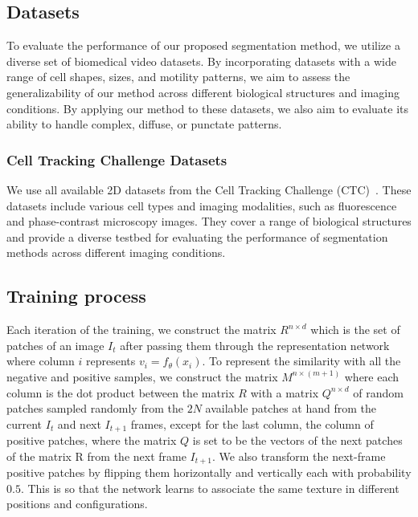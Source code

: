 \documentclass[./dissertation.tex]{subfiles}
\begin{document}
\subsection{Datasets}


To evaluate the performance of our proposed segmentation method, we utilize a diverse set of biomedical video datasets. By incorporating datasets with a wide range of cell shapes, sizes, and motility patterns, we aim to assess the generalizability of our method across different biological structures and imaging conditions. By applying our method to these datasets, we also aim to evaluate its ability to handle complex, diffuse, or punctate patterns.

\subsubsection{Cell Tracking Challenge Datasets}
We use all available 2D datasets from the Cell Tracking Challenge (CTC)~\cite{mavska2023cell}. These datasets include various cell types and imaging modalities, such as fluorescence and phase-contrast microscopy images. They cover a range of biological structures and provide a diverse testbed for evaluating the performance of segmentation methods across different imaging conditions.



\subsection{Training process}

Each iteration of the training, we construct the matrix \(R^{n \times d}\) which is the set of patches of an image \(I_t\) after passing them through the representation network where column \(i\) represents \(v_i = f_\theta(x_i)\). To represent the similarity with all the negative and positive samples, we construct the matrix \(M ^{n \times (m+1)}\) where each column is the dot product between the matrix \(R\) with a matrix \(Q^{n\times d}\) of random patches sampled randomly from the \(2N\) available patches at hand from the current \(I_t\) and next \(I_{t+1}\) frames, except for the last column, the column of positive patches, where the matrix \(Q\) is set to be the vectors of the next patches of the matrix R from the next frame \(I_{t+1}\). We also transform the next-frame positive patches by flipping them horizontally and vertically each with probability \(0.5\). This is so that the network learns to associate the same texture in different positions and configurations.
\end{document}

